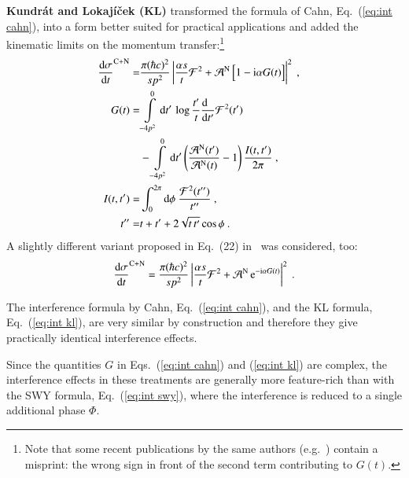 {\bf Kundr\' at and Lokaj\' i\v cek (KL)} \cite{kl94} transformed the formula of Cahn, Eq.~(\ref{eq:int cahn}), into a form better suited for practical applications and added the kinematic limits on the momentum transfer:\footnote{%
Note that some recent publications by the same authors (e.g.~\cite{kl05,kklp11}) contain a misprint: the wrong sign in front of the second term contributing to $G(t)$.
}
\begin{equation}
\label{eq:int kl}
	\begin{aligned}
		{\d\sigma\over \d t}^{\rm C+N} =& {\pi (\hbar c)^2 \over s p^2} \left | {\alpha s\over t} {\cal F}^2
			+ {\cal A}^{\rm N}\, \Big[1 - \I\alpha G(t)\Big] \right |^2\ ,\cr
		G(t) =& \int\limits_{-4p^2}^0 \d t'\, \log {t'\over t} {\d\phantom{t'}\over \d t'} {\cal F}^2(t')\cr
			  &- \int\limits_{-4p^2}^0 \d t' \left( {{\cal A}^{\rm N}(t') \over {\cal A}^{\rm N}(t)} - 1 \right) { I(t, t')\over 2\pi }\ , \cr
		I(t, t') =& \int_0^{2\pi} \d\phi\ {{\cal F}^2(t'')\over t''}\ ,\cr
		t'' =& t + t' + 2\sqrt{t\, t'} \cos\phi\ .\cr
	\end{aligned}
\end{equation}
A slightly different variant proposed in Eq.~(22) in~\cite{kl05} was considered, too:
\begin{equation}
\label{eq:int kl exp}
	{\d\sigma\over \d t}^{\rm C+N} = {\pi (\hbar c)^2 \over s p^2} \left | {\alpha s\over t} {\cal F}^2
		+ {\cal A}^{\rm N}\, \e^{- \I\alpha G(t)} \right |^2 \ .
\end{equation}

The interference formula by Cahn, Eq.~(\ref{eq:int cahn}), and the KL formula, Eq.~(\ref{eq:int kl}), are very similar by construction and therefore they give practically identical interference effects.

Since the quantities $G$ in Eqs.~(\ref{eq:int cahn}) and (\ref{eq:int kl}) are complex, the interference effects in these treatments are generally more feature-rich than with the SWY formula, Eq.~(\ref{eq:int swy}), where the interference is reduced to a single additional phase $\Phi$.

